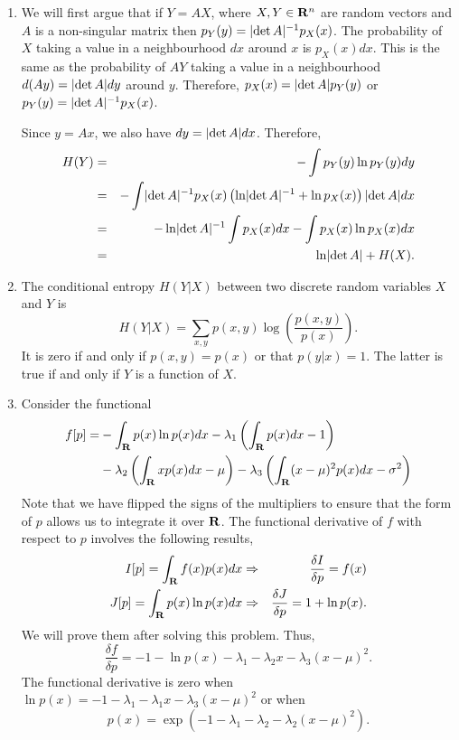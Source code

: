 \begin{enumerate}
\item We will first argue that if $Y = AX$, where $X, Y \in \mathbf{R}^n$ are random vectors and $A$ is
a non-singular matrix then $p_Y(y) = \lvert\det{A}\rvert^{-1}p_X(x)$. The probability of $X$ taking a value
in a neighbourhood $dx$ around $x$ is $p_X(x)dx$. This is the same as the probability of $AY$ taking
a value in a neighbourhood $d(Ay) = \lvert\det{A}\rvert dy$ around $y$. Therefore, $p_X(x) = \lvert\det{A}\rvert p_Y(y)$ 
or $p_Y(y) = \lvert\det{A}\rvert^{-1}p_X(x)$.

Since $y = Ax$, we also have $dy = \lvert\det{A}\rvert dx$. Therefore,
\begin{eqnarray*}
H(Y) &=& -\int p_Y(y)\ln p_Y(y)dy \\
     &=& -\int \lvert\det{A}\rvert^{-1}p_X(x)\left(\ln\lvert\det{A}\rvert^{-1} + \ln p_X(x)\right)\lvert\det{A}\rvert dx \\
     &=& -\ln\lvert\det{A}\rvert^{-1}\int p_X(x)dx - \int p_X(x)\ln p_X(x)dx \\
     &=& \ln\lvert\det{A}\rvert + H(X).
\end{eqnarray*}

\item The conditional entropy $H(Y|X)$ between two discrete random variables $X$ and $Y$ is
\[
H(Y|X) = \sum_{x, y} p(x, y)\log\left(\frac{p(x, y)}{p(x)}\right).
\]
It is zero if and only if $p(x, y) = p(x)$ or that $p(y|x) = 1$. The latter is true if and only if
$Y$ is a function of $X$.

\item Consider the functional
\[
\begin{split}
f[p] =& -\int_{\mathbf{R}} p(x)\ln p(x)dx - \lambda_1\left(\int_{\mathbf{R}} p(x)dx - 1\right) \\
      & -\lambda_2\left(\int_{\mathbf{R}} xp(x)dx - \mu\right) - \lambda_3\left(\int_{\mathbf{R}} (x - \mu)^2p(x)dx - \sigma^2\right)
\end{split}
\]
Note that we have flipped the signs of the multipliers to ensure that the form of $p$ allows 
us to integrate it over $\mathbf{R}$. The functional derivative of $f$ with respect to $p$ involves 
the following results,
\begin{eqnarray*}
I[p] = \int_{\mathbf{R}} f(x)p(x)dx &\Rightarrow& \frac{\delta I}{\delta p} = f(x) \\
J[p] = \int_{\mathbf{R}} p(x)\ln p(x)dx &\Rightarrow& \frac{\delta J}{\delta p} = 1 + \ln p(x).
\end{eqnarray*}
We will prove them after solving this problem. Thus,
\[
\frac{\delta f}{\delta p} = -1 - \ln p(x) - \lambda_1 - \lambda_2 x - \lambda_3 (x - \mu)^2.
\]
The functional derivative is zero when $\ln p(x) = -1 - \lambda_1 - \lambda_1 x - \lambda_3(x - \mu)^2$ 
or when
\[
p(x) = \exp\left(-1 - \lambda_1 - \lambda_2 - \lambda_2 (x - \mu)^2\right).
\]


\end{enumerate}
